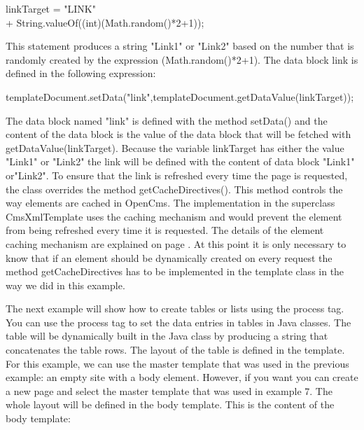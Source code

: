 \begin{java}
linkTarget = "LINK"\\
\jtabd              + String.valueOf((int)(Math.random()*2+1));\\
\end{java}

This statement produces a string {\name "Link1"} or {\name "Link2"} based on the number
that is randomly created by the expression {\name (Math.random()*2+1)}.
The data block link is defined in the following expression:

{\code templateDocument.setData("link",templateDocument.getDataValue(linkTarget));}

The data block named {\name "link"} is defined with the method {\meth setData()} and
the content of the data block is the value of the data block that will
be fetched with {\meth getDataValue(linkTarget)}. Because the variable
{\name linkTarget} has either the value {\name "Link1"} or {\name "Link2"} the link will be
defined with the content of data block {\name "Link1"} or{\name  "Link2"}.
To ensure that the link is refreshed every time the page is requested,
the class overrides the method {\meth getCacheDirectives()}. This method controls
the way elements are cached in OpenCms. The implementation in the superclass
{\class CmsXmlTemplate} uses the caching mechanism and would prevent the element
from being refreshed every time it is requested. The details of the element caching mechanism 
are explained on page \pageref{element cache}.
At this point it is only necessary to know that if an element should be dynamically created
on every request the method {\meth getCacheDirectives} has to be implemented in the template class
in the way we did in this example.


The next example will show how to create tables or lists using the
{\tag process} tag. You can use the {\tag process} tag to set the data entries in
tables in Java classes. The table will be dynamically built in the Java
class by producing a string that concatenates the table rows. The
layout of the table is defined in the template. For this example, we
can use the master template that was used in the previous example: an
empty site with a body element. However, if you want you can create a
new page and select the master template that was used in {\name example 7.} The
whole layout will be defined in the body template. This is the content
of the body template:

